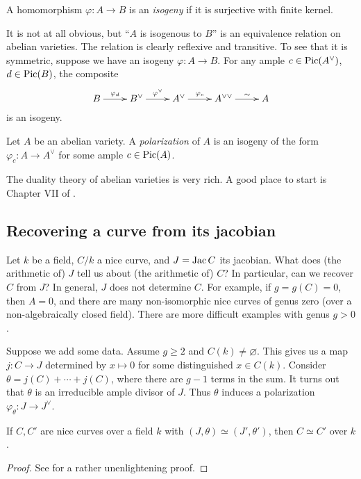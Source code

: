 \begin{definition}
A homomorphism $\varphi:A\to B$ is an \emph{isogeny} if it is surjective with 
finite kernel.
\end{definition}

It is not at all obvious, but ``$A$ is isogenous to $B$'' is an equivalence 
relation on abelian varieties. The relation is clearly reflexive and 
transitive. To see that it is symmetric, suppose we have an 
isogeny $\varphi:A\to B$. For any ample $c\in \operatorname{Pic}(A^\vee)$, $d\in \operatorname{Pic}(B)$, 
the composite 
\[\xymatrix{
  B \ar[r]^-{\varphi_d} 
    & B^\vee \ar[r]^-{\varphi^\vee} 
    & A^\vee \ar[r]^-{\varphi_c}
    & A^{\vee\vee} \ar[r]^-\sim 
    & A
}\]
is an isogeny. 

\begin{definition}
Let $A$ be an abelian variety. A \emph{polarization} of $A$ is an isogeny 
of the form $\varphi_c:A\to A^\vee$ for some ample $c\in \operatorname{Pic}(A)$.
\end{definition}

The duality theory of abelian varieties is very rich. A good place to start 
is Chapter VII of \cite{gm13}. 





\subsection{Recovering a curve from its jacobian}

Let $k$ be a field, $C/k$ a nice curve, and $J=\operatorname{Jac} C$ its jacobian. What does 
(the arithmetic of) $J$ tell us about (the arithmetic of) $C$? In particular, 
can we recover $C$ from $J$? In general, $J$ does not determine $C$. For 
example, if $g=g(C)=0$, then $A=0$, and there are many non-isomorphic nice 
curves of genus zero (over a non-algebraically closed field). There are more 
difficult examples with genus $g>0$. 

Suppose we add some data. Assume $g\geqslant 2$ and $C(k)\ne\varnothing$. This 
gives us a map $j:C\to J$ determined by $x\mapsto 0$ for some distinguished 
$x\in C(k)$. Consider $\theta = j(C)+\cdots + j(C)$, where there are $g-1$ 
terms in the sum. It turns out that $\theta$ is an irreducible ample divisor of 
$J$. Thus $\theta$ induces a polarization $\varphi_\theta:J\to J^\vee$. 

\begin{theorem}[Torelli]
If $C,C'$ are nice curves over a field $k$ with $(J,\theta)\simeq (J',\theta')$, 
then $C\simeq C'$ over $k$. 
\end{theorem}
\begin{proof}
See \cite[III.13]{mi-av} for a rather unenlightening proof. 
\end{proof}

